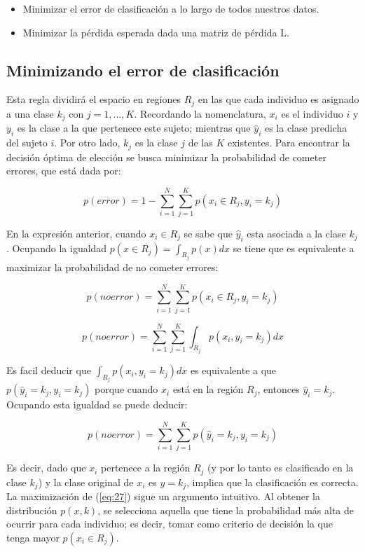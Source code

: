 \begin{itemize}
\item Minimizar el error de clasificación a lo largo de todos nuestros datos.
\item Minimizar la pérdida esperada dada una matriz de pérdida L. 
\end{itemize}


\subsection{Minimizando el error de clasificación}
Esta regla dividirá el espacio en regiones $R_j$ en las que cada individuo es asignado a una clase $k_j$ con $j = 1, ... , K$. Recordando la nomenclatura, $x_i$ es el individuo $i$ y $y_i$ es la clase a la que pertenece este sujeto; mientras que $\widehat{y}_i$ es la clase predicha del sujeto $i$. Por otro lado, $k_j$ es la clase $j$ de las $K$ existentes. Para encontrar la decisión óptima de elección se busca minimizar la probabilidad de cometer errores, que está dada por:



$$p(error) = 1 - \sum_{i = 1}^{N} \sum_{j=1}^{K} p(x_i \in R_{j}, y_i = k_j)$$

En la expresión anterior, cuando $x_i \in R_j$ se sabe que $\widehat{y}_i$ esta asociada a la clase $k_j$. Ocupando la igualdad $p(x \in R_{j}) = \int_{R_j} p(x) dx$ se tiene que es equivalente a maximizar la probabilidad de no cometer errores:

$$p(no error) = \sum_{i = 1}^{N} \sum_{j=1}^{K} p(x_i \in R_{j},  y_i = k_j)$$

$$p(no error) = \sum_{i = 1}^{N} \sum_{j=1}^{K} \int_{R_j} p(x_i, y_i = k_j) dx $$

Es facil deducir que $\int_{R_j} p(x_i, y_i = k_j) dx$ es equivalente a que $p(\widehat{y}_i = k_j, y_i = k_j)$ porque cuando $x_i$ está en la región $R_j$, entonces $\widehat{y}_i = k_j$. Ocupando esta igualdad se puede deducir:

\begin{equation}\label{eq:27}
p(no error) = \sum_{i = 1}^{N} \sum_{j=1}^{K} p(\widehat{y}_i = k_j, y_i = k_j) 
\end{equation}

Es decir, dado que $x_i$ pertenece a la región $R_{j}$ (y por lo tanto es clasificado en la clase $k_j$) y la clase original de $x_i$ es $y = k_j$, implica que la clasificación es correcta. La maximización de (\ref{eq:27}) sigue un argumento intuitivo. Al obtener la distribución $p(x, k)$, se selecciona aquella que tiene la probabilidad más alta de ocurrir para cada individuo; es decir, tomar como criterio de decisión la que tenga mayor $p(x_i \in R_j)$. 

